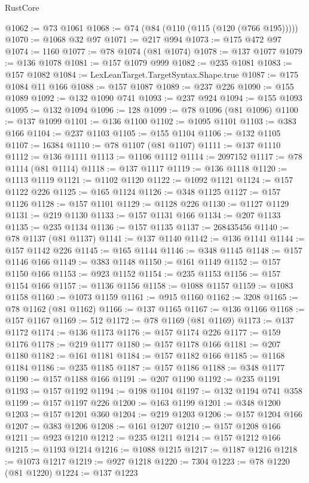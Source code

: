 \begin{lexlean}{RustCore}
\begin{coremodule}
@1062 := @73 @1061
@1068 := @74 (@84 (@110 (@115 (@120 (@766 @195)))))
@1070 := @1068 @32 @97
@1071 := @217 @994
@1073 := @175 @472 @97
@1074 := 1160
@1077 := @78 @1074 (@81 @1074)
@1078 := @137 @1077
@1079 := @136 @1078
@1081 := @157 @1079 @999
@1082 := @235 @1081
@1083 := @157 @1082
@1084 := LexLeanTarget.TargetSyntax.Shape.true
@1087 := @175 @1084 @11 @166
@1088 := @157 @1087
@1089 := @237 @226
@1090 := @155 @1089
@1092 := @132 @1090 @741
@1093 := @237 @924
@1094 := @155 @1093
@1095 := @132 @1094
@1096 := 128
@1099 := @78 @1096 (@81 @1096)
@1100 := @137 @1099
@1101 := @136 @1100
@1102 := @1095 @1101
@1103 := @383 @166
@1104 := @237 @1103
@1105 := @155 @1104
@1106 := @132 @1105
@1107 := 16384
@1110 := @78 @1107 (@81 @1107)
@1111 := @137 @1110
@1112 := @136 @1111
@1113 := @1106 @1112
@1114 := 2097152
@1117 := @78 @1114 (@81 @1114)
@1118 := @137 @1117
@1119 := @136 @1118
@1120 := @1113 @1119
@1121 := @1102 @1120
@1122 := @1092 @1121
@1124 := @157 @1122 @226
@1125 := @165 @1124
@1126 := @348 @1125
@1127 := @157 @1126
@1128 := @157 @1101
@1129 := @1128 @226
@1130 := @1127 @1129
@1131 := @219 @1130
@1133 := @157 @1131 @166
@1134 := @207 @1133
@1135 := @235 @1134
@1136 := @157 @1135
@1137 := 268435456
@1140 := @78 @1137 (@81 @1137)
@1141 := @137 @1140
@1142 := @136 @1141
@1144 := @157 @1142 @226
@1145 := @165 @1144
@1146 := @348 @1145
@1148 := @157 @1146 @166
@1149 := @383 @1148
@1150 := @161 @1149
@1152 := @157 @1150 @166
@1153 := @923 @1152
@1154 := @235 @1153
@1156 := @157 @1154 @166
@1157 := @1136 @1156
@1158 := @1088 @1157
@1159 := @1083 @1158
@1160 := @1073 @1159
@1161 := @915 @1160
@1162 := 3208
@1165 := @78 @1162 (@81 @1162)
@1166 := @137 @1165
@1167 := @136 @1166
@1168 := @157 @1167
@1169 := 512
@1172 := @78 @1169 (@81 @1169)
@1173 := @137 @1172
@1174 := @136 @1173
@1176 := @157 @1174 @226
@1177 := @159 @1176
@1178 := @219 @1177
@1180 := @157 @1178 @166
@1181 := @207 @1180
@1182 := @161 @1181
@1184 := @157 @1182 @166
@1185 := @1168 @1184
@1186 := @235 @1185
@1187 := @157 @1186
@1188 := @348 @1177
@1190 := @157 @1188 @166
@1191 := @207 @1190
@1192 := @235 @1191
@1193 := @157 @1192
@1194 := @198 @1104
@1197 := @132 @1194 @741 @358
@1199 := @157 @1197 @226
@1200 := @163 @1199
@1201 := @348 @1200
@1203 := @157 @1201 @360
@1204 := @219 @1203
@1206 := @157 @1204 @166
@1207 := @383 @1206
@1208 := @161 @1207
@1210 := @157 @1208 @166
@1211 := @923 @1210
@1212 := @235 @1211
@1214 := @157 @1212 @166
@1215 := @1193 @1214
@1216 := @1088 @1215
@1217 := @1187 @1216
@1218 := @1073 @1217
@1219 := @927 @1218
@1220 := 7304
@1223 := @78 @1220 (@81 @1220)
@1224 := @137 @1223

\end{coremodule}
\end{lexlean}
